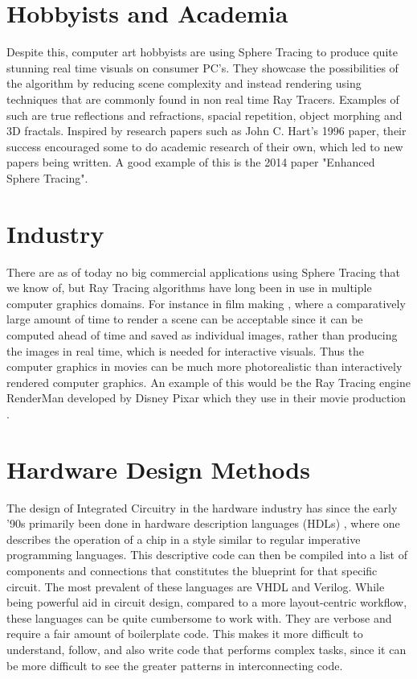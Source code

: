 	\section{ Hobbyists and Academia }

		Despite this, computer art hobbyists are using Sphere Tracing to
		produce quite stunning real time visuals on consumer PC's. They
		showcase the possibilities of the algorithm by reducing scene
		complexity and instead rendering using techniques that are commonly
		found in non real time Ray Tracers. Examples of such are true
		reflections and refractions, spacial repetition, object morphing and 3D
		fractals\cite{InigoQuilez}.  Inspired by research papers such as John
		C. Hart's 1996 paper\cite{Hart1996}, their success encouraged some
		to do academic research of their own, which led to new papers being
		written. A good example of this is the 2014 paper "Enhanced Sphere
		Tracing"\cite{Korndorfer2014}.

	\section{ Industry }		

		There are as of today no big commercial applications using Sphere Tracing
		that we know of, but Ray Tracing algorithms have long been in use in
		multiple computer graphics domains. For instance in film making
		\cite{Christensen2006}, where a comparatively large amount of time to
		render a scene can be acceptable since it can be computed ahead of time
		and saved as individual images, rather than producing the images in real
		time, which is needed for interactive visuals. Thus the computer
		graphics in movies can be much more photorealistic than interactively
		rendered computer graphics. An example of this would be the Ray Tracing
		engine RenderMan developed by Disney Pixar which they use in their movie 
		production \cite{Christensen2006}.

	\section{ Hardware Design Methods } 
	
		The design of Integrated Circuitry in the hardware industry has since
		the early '90s primarily been done in hardware description languages
		(HDLs) \cite{Chen2012}, where one describes the operation of a chip in a
		style similar to regular imperative programming languages. This
		descriptive code can then be compiled into a list of components and
		connections that constitutes the blueprint for that specific circuit.
		The most prevalent of these languages are VHDL and Verilog\cite{TODO}.
		While being powerful aid in circuit design, compared to a more 
		layout-centric workflow, %
		these languages can be quite cumbersome to work with. They are verbose
		and require a fair amount of boilerplate code. This makes it more
		difficult to understand, follow, and also write code that performs
		complex tasks, since it can be more difficult to see the greater
		patterns in interconnecting code\cite{TODO}.
		
